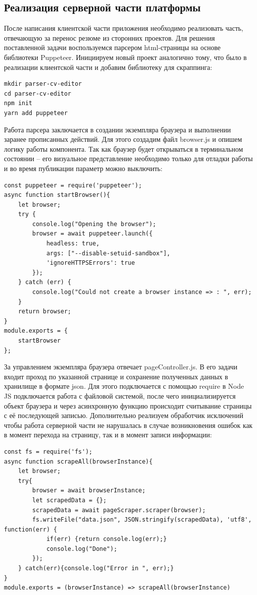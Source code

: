 \documentclass[master, och, diploma]{SCWorks}
\begin{document}
\subsection{Реализация серверной части платформы}
После написания клиентской части приложения необходимо реализовать часть, отвечающую за перенос резюме из сторонних проектов. Для решения поставленной задачи воспользуемся парсером html-страницы на основе библиотеки Puppeteer. Инициируем новый проект аналогично тому, что было в реализации клиентской части и добавим библиотеку для скраппинга:
\begin{verbatim}
mkdir parser-cv-editor
cd parser-cv-editor
npm init
yarn add puppeteer
\end{verbatim}


Работа парсера заключается в создании экземпляра браузера и выполнении заранее прописанных действий. Для этого создадим файл browser.js и опишем логику работы компонента. Так как браузер будет открываться в терминальном состоянии – его визуальное представление необходимо только для отладки работы и во время публикации параметр можно выключить:
\begin{verbatim}
const puppeteer = require('puppeteer');
async function startBrowser(){
	let browser;
	try {
	    console.log("Opening the browser");
	    browser = await puppeteer.launch({
	        headless: true,
	        args: ["--disable-setuid-sandbox"],
	        'ignoreHTTPSErrors': true
	    });
	} catch (err) {
	    console.log("Could not create a browser instance => : ", err);
	}
	return browser;
}
module.exports = {
	startBrowser
};
\end{verbatim}


За управлением экземпляра браузера отвечает pageController.js. В его задачи входит проход по указанной странице и сохранение полученных данных в хранилище в формате json. Для этого подключается с помощью require в Node JS подключается работа с файловой системой, после чего инициализируется объект браузера и через асинхронную функцию происходит считывание страницы с её последующей записью. Дополнительно реализуем обработчик исключений чтобы работа серверной части не нарушалась в случае возникновения ошибок как в момент перехода на страницу, так и в момент записи информации:
\begin{verbatim}
const fs = require('fs');
async function scrapeAll(browserInstance){
    let browser;
	try{
	    browser = await browserInstance;
	    let scrapedData = {};
	    scrapedData = await pageScraper.scraper(browser);
	    fs.writeFile("data.json", JSON.stringify(scrapedData), 'utf8', function(err) {
		    if(err) {return console.log(err);}
		    console.log("Done");
	    });
    } catch(err){console.log("Error in ", err);}
}
module.exports = (browserInstance) => scrapeAll(browserInstance)
\end{verbatim}
\end{document}
